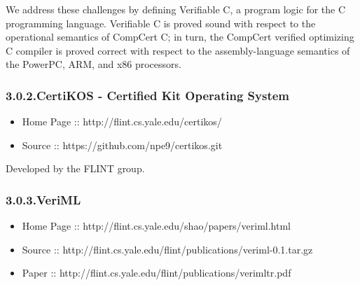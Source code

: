\documentclass[12pt,twoside]{article}
\begin{document}
\noindent{}We address these challenges by defining Verifiable C, a program logic
for the C programming language. Verifiable C is proved sound with
respect to the operational semantics of CompCert C; in turn, the
CompCert verified optimizing C compiler is proved correct with respect
to the assembly-language semantics of the PowerPC, ARM, and x86
processors.%

\subsubsection{3.0.2.\hspace*{0.5em}CertiKOS - Certified Kit Operating System}\label{sec-certikos---certified-kit-operating-system}%

\begin{itemize}[noitemsep,topsep=\mdcompacttopsep]%

\item{}Home Page :: http://flint.cs.yale.edu/certikos/%

\item{}Source :: https://github.com/npe9/certikos.git%
\end{itemize}%

\noindent{}Developed by the FLINT group.%

\subsubsection{3.0.3.\hspace*{0.5em}VeriML}\label{sec-veriml}%

\begin{itemize}[noitemsep,topsep=\mdcompacttopsep]%

\item{}Home Page :: http://flint.cs.yale.edu/shao/papers/veriml.html%

\item{}Source :: http://flint.cs.yale.edu/flint/publications/veriml-0.1.tar.gz%

\item{}Paper :: http://flint.cs.yale.edu/flint/publications/verimltr.pdf%
\end{itemize}%
\end{document}
